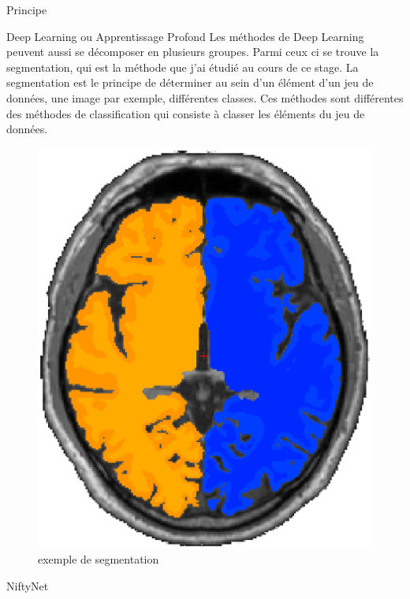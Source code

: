 \documentclass{book}
\newcommand{\p}{\vspace{0.2cm}}
\begin{document}
\begin{chapter}{Principe}
\begin{section}{Deep Learning ou Apprentissage Profond}
			Les méthodes de Deep Learning peuvent aussi se décomposer en plusieurs groupes. Parmi ceux ci se trouve la segmentation, qui est la méthode que j'ai étudié au cours de ce stage. La segmentation est le principe de déterminer au sein d'un élément d'un jeu de données, une image par exemple, différentes classes. Ces méthodes sont différentes des méthodes de classification qui consiste à classer les éléments du jeu de données.\clearpage
			\begin{figure}
				\begin{center}
					\includegraphics[scale=0.5]{annex/segmentation}
					\caption{exemple de segmentation}
					\label{segmentation}
				\end{center}
			\end{figure}\p

		\end{section}

		\begin{section}{NiftyNet}


\end{section}
\end{chapter}
\end{document}
